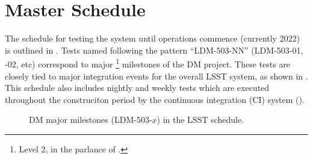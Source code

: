 \section{Master Schedule\label{sect:schedule}}

The schedule for testing the system until operations commence (currently 2022) is outlined in .
Tests named following the pattern ``LDM-503-NN'' (LDM-503-01, -02, etc) correspond to major \footnote{Level 2, in the parlance of .} milestones of the DM project.
These tests are closely tied to major integration events for the overall LSST system, as shown in .
This schedule also includes nightly and weekly tests which are executed throughout the construciton period by the continuous integration (CI) system ().



\begin{figure}[htbp]

\begin{center}



\end{center}

\caption{DM major milestones (LDM-503-$x$) in the LSST schedule. \label{fig:schedule}}
\end{figure}
